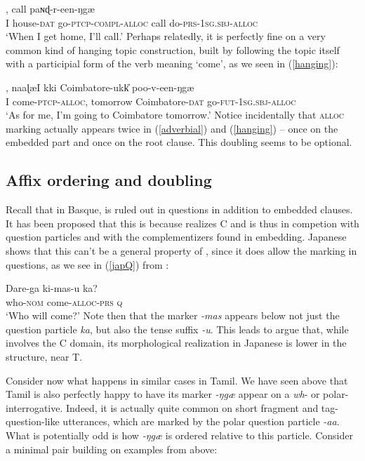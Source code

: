 \documentclass[output=paper, modfonts, nonflat]{langsci/langscibook}
\begin{document}
\ea\label{adverbial},
call paɴɖ-r-een-ŋgæ\\ 
I house-\textsc{dat}{} go-\textsc{ptcp}-\textsc{compl}-\textsc{alloc}{} call
do-\textsc{prs}-\textsc{1sg}.\textsc{sbj}-\textsc{alloc}\\ 
\glt `When I get home, I'll call.'
\z
%
Perhaps relatedly, it is perfectly fine on a very common kind of
hanging topic construction, built by following the topic itself with a
participial form of the verb meaning `come', as we seen in
(\ref{hanging}):

\ea\label{hanging}, naaɭæI kki
Coimbatore-ukk\U{} poo-v-een-ŋgæ\\
I come-\textsc{ptcp}-\textsc{alloc}, tomorrow Coimbatore-\textsc{dat}{}
go-\textsc{fut}-\textsc{1sg}.\textsc{sbj}-\textsc{alloc}\\ 
\glt `As for me, I'm going to Coimbatore tomorrow.'
\z
%
Notice incidentally that \textsc{alloc}{} marking actually appears twice in
(\ref{adverbial}) and (\ref{hanging}) -- once on the embedded part
and once on the root clause. This doubling seems to be optional. 


\subsection{Affix ordering and doubling}
\label{sec:orderdoub}


Recall that in Basque, \allagr{} is ruled out in questions in addition
to embedded clauses. It has been proposed that this is because
\allagr{} realizes C and is thus in competion with question particles
and with the complementizers found in embedding.  Japanese shows that
this can't be a general property of \allagr, since it does allow the
marking in questions, as we see in (\ref{japQ}) from
\citet{miyagawa:2017}:

\ea\label{japQ}\gll Dare-ga ki-mas-u ka?\\
who-\textsc{nom}{} come-\textsc{alloc}-\textsc{prs}{} \textsc{q}\\
\glt `Who will come?'
\z
%
Note then that the \allagr{} marker \textit{-mas} appears below not
just the question particle \textit{ka}, but also the tense suffix
\textit{-u}. This leads \citet{miyagawa:2017} to argue that, while
\allagr{} involves the C domain, its morphological realization in
Japanese is lower in the structure, near T.

Consider now what happens in similar cases in Tamil.  We have seen
above that Tamil is also perfectly happy to have its \allagr{} marker
\textit{-ŋgæ} appear on a \textit{wh}- or polar-interrogative.
Indeed, it is actually quite common on short fragment and
tag-question-like utterances, which are marked by the polar question
particle \textit{-aa}.  What is potentially odd is how \textit{-ŋgæ}
is ordered relative to this particle.  Consider a minimal pair
building on examples from above:
\end{document}
